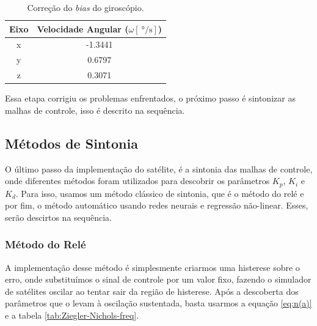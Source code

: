 \begin{table}[H]
  \caption{Correção do \textit{bias} do giroscópio.}
  \label{tab:bias_correction}
  \centering%
  \begin{minipage}{.42\textwidth}
    \begin{tabular*}{\textwidth}{cc}
      \hline
      {Eixo} & Velocidade Angular ($\omega [\SI{}{\degree\per\second}]$)\\ \hline
      \hline
      x  &  -1.3441 \\ 
      y  &  0.6797 \\
      z  &  0.3071 \\ \hline
    \end{tabular*}
  \end{minipage}
\end{table}

Essa etapa corrigiu os problemas enfrentados, o próximo passo é sintonizar as malhas de controle, isso é descrito na sequência.



\subsection{Métodos de Sintonia}

O último passo da implementação do satélite, é a sintonia das malhas de controle, onde diferentes métodos foram utilizados para descobrir os parâmetros \textit{$K_p$}, \textit{$K_i$} e \textit{$K_d$}. Para isso, usamos um método clássico de sintonia, que é o método do relé e por fim, o método automático usando redes neurais e regressão não-linear. Esses, serão descirtos na sequência. 



\subsubsection{Método do Relé}

A implementação desse método é simplesmente criarmos uma histerese sobre o erro, onde substituímos o sinal de controle por um valor fixo, fazendo o simulador de satélites oscilar ao tentar sair da região de histerese. Após a descoberta dos parâmetros que o levam  à oscilação sustentada, basta usarmos a equação \ref{eq:n(a)} e a tabela \ref{tab:Ziegler-Nichols-freq}.



